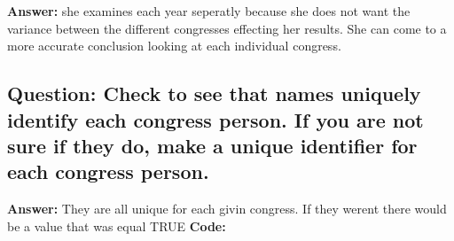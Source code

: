 \documentclass[
]{article}
\newenvironment{Shaded}{\begin{snugshade}}{\end{snugshade}}
\newcommand{\FunctionTok}[1]{\textcolor[rgb]{0.13,0.29,0.53}{\textbf{#1}}}
\newcommand{\NormalTok}[1]{#1}
\newcommand{\OtherTok}[1]{\textcolor[rgb]{0.56,0.35,0.01}{#1}}
\newcommand{\SpecialCharTok}[1]{\textcolor[rgb]{0.81,0.36,0.00}{\textbf{#1}}}
\newcommand{\StringTok}[1]{\textcolor[rgb]{0.31,0.60,0.02}{#1}}
\begin{document}
\textbf{Answer:} she examines each year seperatly because she does not
want the variance between the different congresses effecting her
results. She can come to a more accurate conclusion looking at each
individual congress.

\clearpage

\hypertarget{question-check-to-see-that-names-uniquely-identify-each-congress-person.-if-you-are-not-sure-if-they-do-make-a-unique-identifier-for-each-congress-person.}{%
\subsection{Question: Check to see that names uniquely identify each
congress person. If you are not sure if they do, make a unique
identifier for each congress
person.}\label{question-check-to-see-that-names-uniquely-identify-each-congress-person.-if-you-are-not-sure-if-they-do-make-a-unique-identifier-for-each-congress-person.}}

\textbf{Answer:} They are all unique for each givin congress. If they
werent there would be a value that was equal TRUE \textbf{Code:}

\begin{Shaded}
\end{Shaded}
\end{document}
